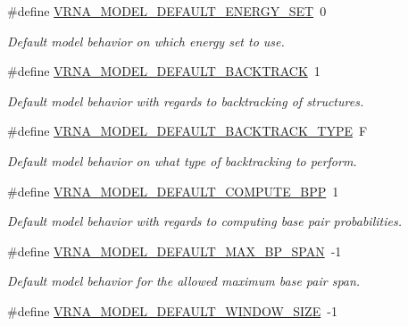 \begin{DoxyCompactItemize}
\#define \mbox{\hyperlink{group__model__details_ga6fcf6b2d0f89256cdbd166486c9b6e1e}{V\+R\+N\+A\+\_\+\+M\+O\+D\+E\+L\+\_\+\+D\+E\+F\+A\+U\+L\+T\+\_\+\+E\+N\+E\+R\+G\+Y\+\_\+\+S\+ET}}~0
\begin{DoxyCompactList}\small\item\em Default model behavior on which energy set to use. \end{DoxyCompactList}\item 
\#define \mbox{\hyperlink{group__model__details_ga3fda8006ab84baf817bd8e5ccbc6bb35}{V\+R\+N\+A\+\_\+\+M\+O\+D\+E\+L\+\_\+\+D\+E\+F\+A\+U\+L\+T\+\_\+\+B\+A\+C\+K\+T\+R\+A\+CK}}~1
\begin{DoxyCompactList}\small\item\em Default model behavior with regards to backtracking of structures. \end{DoxyCompactList}\item 
\#define \mbox{\hyperlink{group__model__details_gad0e81fcaca53c4a826c68e0796de2afb}{V\+R\+N\+A\+\_\+\+M\+O\+D\+E\+L\+\_\+\+D\+E\+F\+A\+U\+L\+T\+\_\+\+B\+A\+C\+K\+T\+R\+A\+C\+K\+\_\+\+T\+Y\+PE}}~\textquotesingle{}F\textquotesingle{}
\begin{DoxyCompactList}\small\item\em Default model behavior on what type of backtracking to perform. \end{DoxyCompactList}\item 
\#define \mbox{\hyperlink{group__model__details_ga1d6cd5051940b126c248147c011bac6c}{V\+R\+N\+A\+\_\+\+M\+O\+D\+E\+L\+\_\+\+D\+E\+F\+A\+U\+L\+T\+\_\+\+C\+O\+M\+P\+U\+T\+E\+\_\+\+B\+PP}}~1
\begin{DoxyCompactList}\small\item\em Default model behavior with regards to computing base pair probabilities. \end{DoxyCompactList}\item 
\#define \mbox{\hyperlink{group__model__details_ga7cb6f4ae8fdebff6746a4410814f2977}{V\+R\+N\+A\+\_\+\+M\+O\+D\+E\+L\+\_\+\+D\+E\+F\+A\+U\+L\+T\+\_\+\+M\+A\+X\+\_\+\+B\+P\+\_\+\+S\+P\+AN}}~-\/1
\begin{DoxyCompactList}\small\item\em Default model behavior for the allowed maximum base pair span. \end{DoxyCompactList}\item 
\#define \mbox{\hyperlink{group__model__details_ga8de04a9cb57e811e313b0f9f207f6bdb}{V\+R\+N\+A\+\_\+\+M\+O\+D\+E\+L\+\_\+\+D\+E\+F\+A\+U\+L\+T\+\_\+\+W\+I\+N\+D\+O\+W\+\_\+\+S\+I\+ZE}}~-\/1

\end{DoxyCompactItemize}
